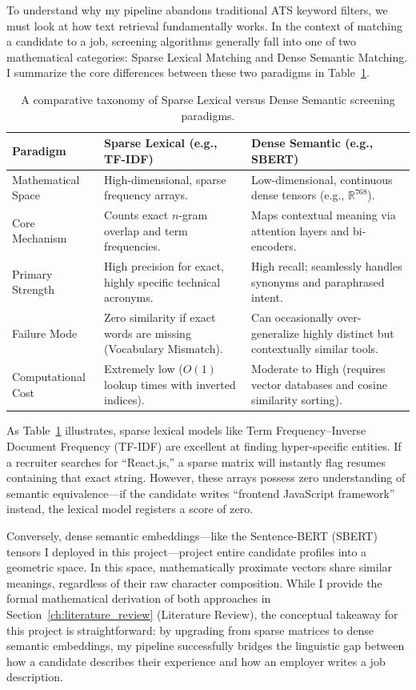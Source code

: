 To understand why my pipeline abandons traditional ATS keyword filters, we must look at how text retrieval fundamentally works. In the context of matching a candidate to a job, screening algorithms generally fall into one of two mathematical categories: Sparse Lexical Matching and Dense Semantic Matching. I summarize the core differences between these two paradigms in Table~\ref{tab:taxonomy_matching}.

\begin{table}[htbp]
\centering
\caption{A comparative taxonomy of Sparse Lexical versus Dense Semantic screening paradigms.}
\label{tab:taxonomy_matching}
\small
\begin{tabular}{@{}>{\raggedright\arraybackslash}p{2.6cm}>{\raggedright\arraybackslash}p{5.6cm}>{\raggedright\arraybackslash}p{5.6cm}@{}}
\toprule
\textbf{Paradigm} & \textbf{Sparse Lexical (e.g., TF-IDF)} & \textbf{Dense Semantic (e.g., SBERT)} \\
\midrule
Mathematical Space & High-dimensional, sparse frequency arrays. & Low-dimensional, continuous dense tensors (e.g., $\mathbb{R}^{768}$). \\
Core Mechanism & Counts exact $n$-gram overlap and term frequencies. & Maps contextual meaning via attention layers and bi-encoders. \\
Primary Strength & High precision for exact, highly specific technical acronyms. & High recall; seamlessly handles synonyms and paraphrased intent. \\
Failure Mode & Zero similarity if exact words are missing (Vocabulary Mismatch). & Can occasionally over-generalize highly distinct but contextually similar tools. \\
Computational Cost & Extremely low ($O(1)$ lookup times with inverted indices). & Moderate to High (requires vector databases and cosine similarity sorting). \\
\bottomrule
\end{tabular}
\end{table}

As Table~\ref{tab:taxonomy_matching} illustrates, sparse lexical models like Term Frequency--Inverse Document Frequency (TF-IDF) are excellent at finding hyper-specific entities. If a recruiter searches for ``React.js,'' a sparse matrix will instantly flag resumes containing that exact string. However, these arrays possess zero understanding of semantic equivalence---if the candidate writes ``frontend JavaScript framework'' instead, the lexical model registers a score of zero.

Conversely, dense semantic embeddings---like the Sentence-BERT (SBERT) tensors I deployed in this project---project entire candidate profiles into a geometric space. In this space, mathematically proximate vectors share similar meanings, regardless of their raw character composition. While I provide the formal mathematical derivation of both approaches in Section~\ref{ch:literature_review} (Literature Review), the conceptual takeaway for this project is straightforward: by upgrading from sparse matrices to dense semantic embeddings, my pipeline successfully bridges the linguistic gap between how a candidate describes their experience and how an employer writes a job description.